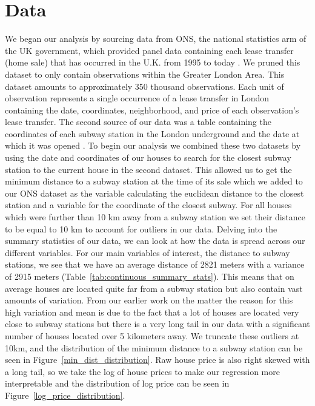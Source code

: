 \section{Data}
\label{sec:data}
We began our analysis by sourcing data from ONS, the national statistics arm of the UK government,
 which provided panel data containing each lease transfer (home sale) that has occurred in the U.K. from 1995 to today \citep{land_ukgov}.
  We pruned this dataset to only contain observations within the Greater London Area.
   This dataset amounts to approximately 350 thousand observations. Each unit of observation represents
    a single occurrence of a lease transfer in London containing the date, coordinates, neighborhood, and price of each observation's
     lease transfer.  The second source of our data was a table containing the coordinates of each subway station in the
      London underground and the date at which it was opened \citep{subway_wikipedia}. 
To begin our analysis we combined these two datasets by using the date and coordinates of our houses to search for the closest
 subway station to the current house in the second dataset. This allowed us to get the minimum distance to a subway station at
  the time of its sale which we added to our ONS dataset as the variable calculating the euclidean distance to the closest station
   and a variable for the coordinate of the closest subway. For all houses which were further than 10 km away from a subway station
    we set their distance to be equal to 10 km to account for outliers in our data.
Delving into the summary statistics of our data, we can look at how the data is spread
 across our different variables. For our main variables of interest, the distance to subway stations, we see that we have an
  average distance of 2821 meters with a variance of 2915 meters (Table~\ref{tab:continuous_summary_stats}). This means that on average houses are located quite far from
   a subway station but also contain vast amounts of variation. From our earlier work on the matter the reason for this high
    variation and mean is due to the fact that a lot of houses are located very close to subway stations but there is a very
     long tail in our data with a significant number of houses located over 5 kilometers away. We truncate these
     outliers at 10km, and the distribution of the minimum distance to a subway station can be seen in Figure~\ref{min_dist_distribution}.
     Raw house price is also right skewed with a long tail, so we take the log of house prices to make our regression more interpretable
      and the distribution of log price can be seen in Figure~\ref{log_price_distribution}.
